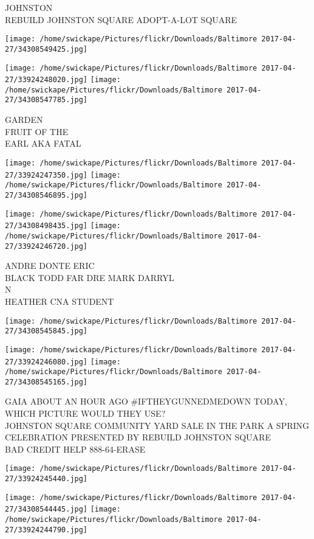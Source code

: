 \documentclass[10pt,letterpaper]{article}
\begin{document}
JOHNSTON\\
REBUILD JOHNSTON SQUARE ADOPT{-}A{-}LOT SQUARE
\pagebreak

\texttt{[image: /home/swickape/Pictures/flickr/Downloads/Baltimore 2017-04-27/34308549425.jpg]}

\vspace{0.25in}
\texttt{[image: /home/swickape/Pictures/flickr/Downloads/Baltimore 2017-04-27/33924248020.jpg]}
\texttt{[image: /home/swickape/Pictures/flickr/Downloads/Baltimore 2017-04-27/34308547785.jpg]}

GARDEN\\
FRUIT OF THE\\
EARL AKA FATAL
\pagebreak

\texttt{[image: /home/swickape/Pictures/flickr/Downloads/Baltimore 2017-04-27/33924247350.jpg]}
\texttt{[image: /home/swickape/Pictures/flickr/Downloads/Baltimore 2017-04-27/34308546895.jpg]}

\texttt{[image: /home/swickape/Pictures/flickr/Downloads/Baltimore 2017-04-27/34308498435.jpg]}
\texttt{[image: /home/swickape/Pictures/flickr/Downloads/Baltimore 2017-04-27/33924246720.jpg]}

ANDRE DONTE ERIC\\
BLACK TODD FAR DRE MARK DARRYL\\
N\\
HEATHER CNA STUDENT
\pagebreak

\texttt{[image: /home/swickape/Pictures/flickr/Downloads/Baltimore 2017-04-27/34308545845.jpg]}

\vspace{0.25in}
\texttt{[image: /home/swickape/Pictures/flickr/Downloads/Baltimore 2017-04-27/33924246080.jpg]}
\texttt{[image: /home/swickape/Pictures/flickr/Downloads/Baltimore 2017-04-27/34308545165.jpg]}

GAIA ABOUT AN HOUR AGO \#IFTHEYGUNNEDMEDOWN TODAY, WHICH PICTURE WOULD THEY USE?\\
JOHNSTON SQUARE COMMUNITY YARD SALE IN THE PARK A SPRING CELEBRATION PRESENTED BY REBUILD JOHNSTON SQUARE\\
BAD CREDIT HELP 888{-}64{-}ERASE
\pagebreak

\texttt{[image: /home/swickape/Pictures/flickr/Downloads/Baltimore 2017-04-27/33924245440.jpg]}

\vspace{0.25in}
\texttt{[image: /home/swickape/Pictures/flickr/Downloads/Baltimore 2017-04-27/34308544445.jpg]}
\texttt{[image: /home/swickape/Pictures/flickr/Downloads/Baltimore 2017-04-27/33924244790.jpg]}
\end{document}
